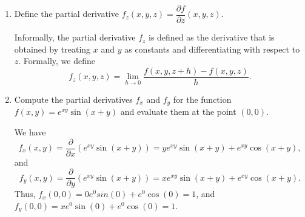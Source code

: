 \documentclass[letterpaper,12pt]{article}
\begin{document}
\begin{enumerate}
\bigskip


 \item Define the partial derivative $f_z(x,y,z) = \dfrac{\partial f}{\partial z}(x,y,z)$.

\bigskip

Informally, the partial derivative $f_z$ is defined as the derivative that is obtained by treating $x$ and $y$ as constants and differentiating with respect to $z$. Formally, we define
\[
 f_z(x,y,z) = \lim_{h\to 0}\frac{f(x,y,z+h)-f(x,y,z)}{h}.
\]

 \item Compute the partial derivatives $f_x$ and $f_y$ for the function $f(x,y) =e^{xy}\sin(x+y)$ and evaluate them at the point $(0,0)$.

\bigskip

We have
\[
 f_x(x,y) = \frac{\partial}{\partial x}(e^{xy}\sin(x+y)) = ye^{xy}\sin(x+y)+e^{xy}\cos(x+y),
\]
and
\[
 f_y(x,y) = \frac{\partial}{\partial y}(e^{xy}\sin(x+y)) = xe^{xy}\sin(x+y)+e^{xy}\cos(x+y).
\]
Thus, $f_x(0,0) = 0e^0sin(0)+e^0\cos(0)=1$, and $f_y(0,0) = xe^0\sin(0)+e^0\cos(0) = 1$.
 
\end{enumerate}
\end{document}

